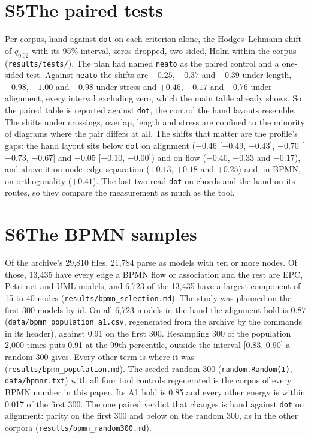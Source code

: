 \documentclass[11pt]{article}
\begin{document}
\section*{S5\quad The paired tests}

Per corpus, hand against \texttt{dot} on each criterion alone, the Hodges--Lehmann shift
of $q_{0.02}$ with its 95\% interval, zeros dropped, two-sided, Holm within the corpus
(\texttt{results/tests/}). The plan had named \texttt{neato} as the paired control and a
one-sided test. Against \texttt{neato} the shifts are $-0.25$, $-0.37$ and $-0.39$ under
length, $-0.98$, $-1.00$ and $-0.98$ under stress and $+0.46$, $+0.17$ and $+0.76$ under
alignment, every interval excluding zero, which the main table already shows. So the
paired table is reported against \texttt{dot}, the control the hand layouts resemble. The shifts under crossings, overlap, length and stress are
confined to the minority of diagrams where the pair differs at all. The shifts that
matter are the profile's gaps: the hand layout sits below \texttt{dot} on alignment
($-0.46$ [$-0.49$, $-0.43$], $-0.70$ [$-0.73$, $-0.67$] and $-0.05$ [$-0.10$, $-0.00$])
and on flow ($-0.40$, $-0.33$ and $-0.17$), and above it on node--edge separation
($+0.13$, $+0.18$ and $+0.25$) and, in BPMN, on orthogonality ($+0.41$). The last two read
\texttt{dot} on chords and the hand on its routes, so they compare the measurement
as much as the tool.

\section*{S6\quad The BPMN samples}

Of the archive's 29,810 files, 21,784 parse as models with ten or more nodes. Of those,
13,435 have every edge a BPMN flow or association and the rest are EPC, Petri net and UML
models, and 6,723 of the 13,435 have a largest component of 15 to 40 nodes
(\texttt{results/bpmn\_selection.md}). The study was planned on the first 300 models by
id. On all 6,723 models in the band the alignment hold is 0.87
(\texttt{data/bpmn\_population\_a1.csv}, regenerated from the archive by the commands in
its header), against 0.91 on the first 300. Resampling 300 of the population 2,000 times
puts 0.91 at the 99th percentile, outside the interval [0.83, 0.90] a random 300 gives. Every other term is where it was
(\texttt{results/bpmn\_population.md}). The seeded random 300
(\texttt{random.Random(1)}, \texttt{data/bpmnr.txt}) with all four tool controls
regenerated is the corpus of every BPMN number in this paper. Its A1 hold is 0.85 and
every other energy is within 0.017 of the first 300. The one paired verdict that changes
is hand against \texttt{dot} on alignment: parity on the first 300 and below on the random
300, as in the other corpora (\texttt{results/bpmn\_random300.md}).
\end{document}

